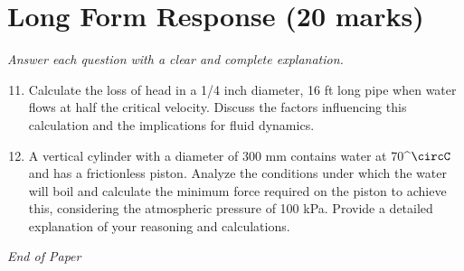 \documentclass[12pt]{article}
\begin{document}
\section*{Long Form Response (20 marks)}
\textit{Answer each question with a clear and complete explanation.}
\begin{enumerate}[label=\arabic*.]
\setcounter{enumi}{10}
\item Calculate the loss of head in a 1/4 inch diameter, 16 ft long pipe when water flows at half the critical velocity. Discuss the factors influencing this calculation and the implications for fluid dynamics.
\item A vertical cylinder with a diameter of 300 mm contains water at 70^\ensuremath{\circC} and has a frictionless piston. Analyze the conditions under which the water will boil and calculate the minimum force required on the piston to achieve this, considering the atmospheric pressure of 100 kPa. Provide a detailed explanation of your reasoning and calculations.
\end{enumerate}

\vfill
\noindent\textit{End of Paper}
\end{document}
